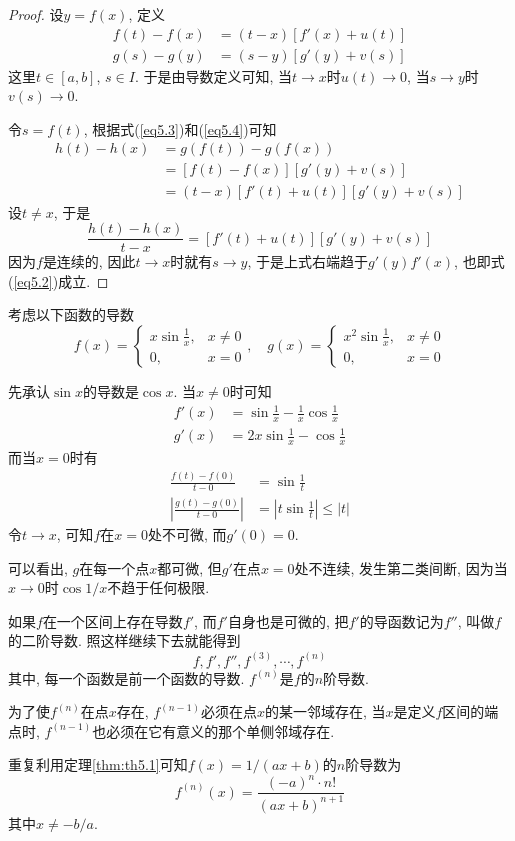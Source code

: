 \documentclass[cn,12pt,math=mtpro2,citestyle=gb7714-2015,bibstyle=gb7714-2015,twocol]{elegantbook}
\begin{document}
\begin{proof}
  设$y=f(x)$, 定义
  \begin{align}
  f(t)-f(x)&=(t-x)[f'(x)+u(t)] \label{eq5.3} \\
  g(s)-g(y)&=(s-y)[g'(y)+v(s)] \label{eq5.4}
  \end{align}
  这里$t\in [a,b]$, $s\in I$. 于是由导数定义可知, 当$t\rightarrow x$时$u(t)\rightarrow 0$, 当$s\rightarrow y$时$v(s)\rightarrow 0$.

  令$s=f(t)$, 根据式(\ref{eq5.3})和(\ref{eq5.4})可知
  \begin{align*}
  h(t)-h(x)&=g(f(t))-g(f(x)) \\
  &=[f(t)-f(x)][g'(y)+v(s)] \\
  &=(t-x)[f'(t)+u(t)][g'(y)+v(s)]
  \end{align*}
  设$t\neq x$, 于是
  $$\frac{h(t)-h(x)}{t-x}=[f'(t)+u(t)][g'(y)+v(s)]$$
  因为$f$是连续的, 因此$t\rightarrow x$时就有$s\rightarrow y$, 于是上式右端趋于$g'(y)f'(x)$, 也即式(\ref{eq5.2})成立.

\end{proof}
\begin{example}
考虑以下函数的导数
$$ f(x) = \begin{cases}
x\sin\displaystyle\frac{1}{x}, & x\neq 0 \\
0, & x=0 \end{cases}, \quad g(x)=\begin{cases}
x^2\sin\displaystyle\frac{1}{x}, & x\neq 0 \\
0, & x=0 \end{cases}$$

先承认$\sin x$的导数是$\cos x$. 当$x\neq 0$时可知
\begin{align*}
f'(x)&=\sin\frac{1}{x}-\frac{1}{x}\cos\frac{1}{x} \\
g'(x)&=2x\sin \frac{1}{x}-\cos\frac{1}{x}
\end{align*}
而当$x=0$时有
\begin{align*}
\frac{f(t)-f(0)}{t-0}&=\sin\frac{1}{t} \\
\left|\frac{g(t)-g(0)}{t-0}\right|&=\left|t\sin\frac{1}{t}\right|\leq |t|
\end{align*}
令$t\rightarrow x$, 可知$f$在$x=0$处不可微, 而$g'(0)=0$.

可以看出, $g$在每一个点$x$都可微, 但$g'$在点$x=0$处不连续, 发生第二类间断, 因为当$x\rightarrow0$时$\displaystyle\cos1/x$不趋于任何极限.
\end{example}
\begin{definition}
如果$f$在一个区间上存在导数$f'$, 而$f'$自身也是可微的, 把$f'$的导函数记为$f''$, 叫做$f$的二阶导数. 照这样继续下去就能得到
$$f, f', f'', f^{(3)},\cdots, f^{(n)}$$
其中, 每一个函数是前一个函数的导数. $f^{(n)}$是$f$的$n$阶导数.
\end{definition}
为了使$f^{(n)}$在点$x$存在, $f^{(n-1)}$必须在点$x$的某一邻域存在, 当$x$是定义$f$区间的端点时, $f^{(n-1)}$也必须在它有意义的那个单侧邻域存在.
\begin{example}
重复利用定理\ref{thm:th5.1}可知$f(x)=1/(ax+b)$的$n$阶导数为
$$f^{(n)}(x)=\frac{(-a)^{n}\cdot n!}{(ax+b)^{n+1}}$$
其中$x\neq -b/a$.
\end{example}
\end{document}
